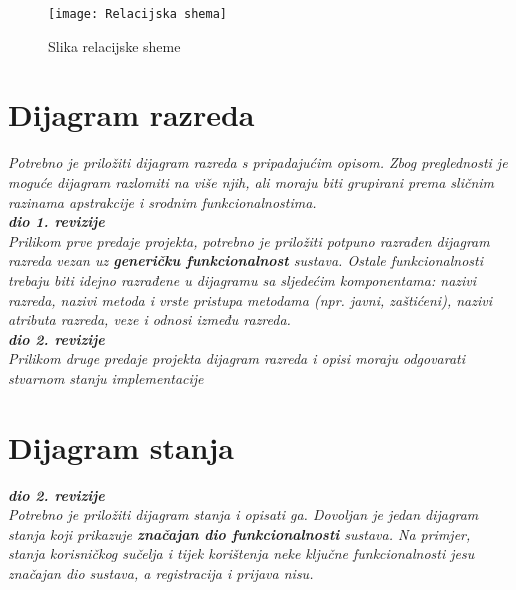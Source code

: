 				\begin{figure}
					\centering
					\texttt{[image: Relacijska shema]}
					\caption{Slika relacijske sheme}
					\label{fig:enter-label}
				\end{figure}
			
			\eject
			
			
		\section{Dijagram razreda}
		
			\textit{Potrebno je priložiti dijagram razreda s pripadajućim opisom. Zbog preglednosti je moguće dijagram razlomiti na više njih, ali moraju biti grupirani prema sličnim razinama apstrakcije i srodnim funkcionalnostima.}\\
			
			\textbf{\textit{dio 1. revizije}}\\
			
			\textit{Prilikom prve predaje projekta, potrebno je priložiti potpuno razrađen dijagram razreda vezan uz \textbf{generičku funkcionalnost} sustava. Ostale funkcionalnosti trebaju biti idejno razrađene u dijagramu sa sljedećim komponentama: nazivi razreda, nazivi metoda i vrste pristupa metodama (npr. javni, zaštićeni), nazivi atributa razreda, veze i odnosi između razreda.}\\
			
			\textbf{\textit{dio 2. revizije}}\\			
			
			\textit{Prilikom druge predaje projekta dijagram razreda i opisi moraju odgovarati stvarnom stanju implementacije}
			
			
			
			\eject
		
		\section{Dijagram stanja}
			
			
			\textbf{\textit{dio 2. revizije}}\\
			
			\textit{Potrebno je priložiti dijagram stanja i opisati ga. Dovoljan je jedan dijagram stanja koji prikazuje \textbf{značajan dio funkcionalnosti} sustava. Na primjer, stanja korisničkog sučelja i tijek korištenja neke ključne funkcionalnosti jesu značajan dio sustava, a registracija i prijava nisu. }
			
			
			\eject 
		
